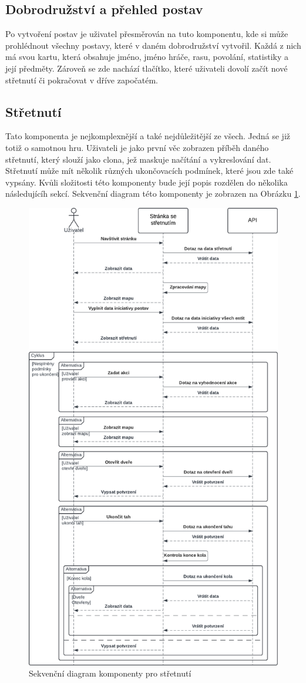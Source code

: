 \subsection{Dobrodružství a přehled postav}
Po vytvoření postav je uživatel přesměrován na tuto komponentu, kde si může prohlédnout všechny postavy, které v daném dobrodružství vytvořil. Každá z nich má svou kartu, která obsahuje jméno, jméno hráče, rasu, povolání, statistiky a její předměty. Zároveň se zde nachází tlačítko, které uživateli dovolí začít nové střetnutí či pokračovat v dříve započatém.

\subsection{Střetnutí}
Tato komponenta je nejkomplexnější a také nejdůležitější ze všech. Jedná se již totiž o samotnou hru. Uživateli je jako první věc zobrazen příběh daného střetnutí, který slouží jako clona, jež maskuje načítání a vykreslování dat. Střetnutí může mít několik různých ukončovacích podmínek, které jsou zde také vypsány. Kvůli složitosti této komponenty bude její popis rozdělen do několika následujícíh sekcí. Sekvenční diagram této komponenty je zobrazen na Obrázku \ref{fig:encounter_diagram}.

\begin{figure}[htbp]
  \centering
  \includegraphics[width=.70\textwidth]{resources/figures/encounter_diagram.pdf}
  \caption{Sekvenční diagram komponenty pro střetnutí}
  \label{fig:encounter_diagram}
\end{figure}

